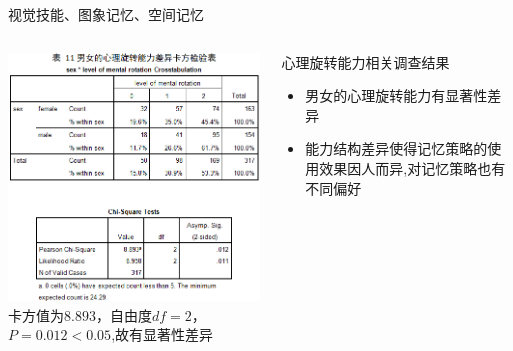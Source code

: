 \documentclass[serif]{beamer}
\begin{document}
    \begin{frame}{视觉技能、图象记忆、空间记忆}
        \begin{columns}
    	\includegraphics[scale=0.5]{mentalrotation.png}\\
    	\tiny{卡方值为$ 8.893 $，自由度$ df=2 $，$ P=0.012<0.05 $,故有显著性差异 }
    	\begin{block}{\small{心理旋转能力相关调查结果}}
    		\begin{itemize}
    			\item  \footnotesize {男女的心理旋转能力有显著性差异}
    			\item  \footnotesize {能力结构差异使得记忆策略的使用效果因人而异,对记忆策略也有不同偏好}
    		\end{itemize}
    	\end{block} 
        \end{columns}
    \end{frame}
    
\end{document}
